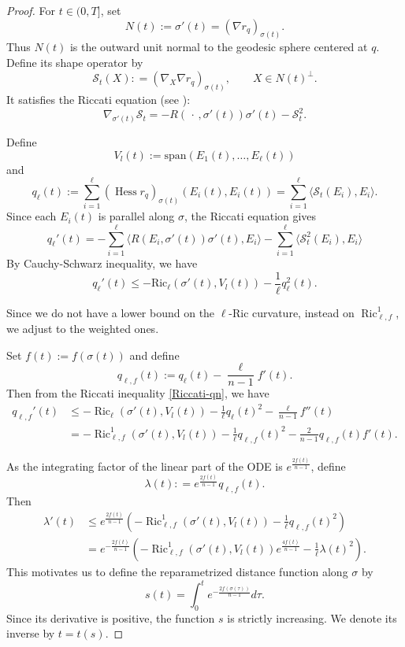 \documentclass[psamsfonts]{amsart}
\theoremstyle{definition}
\theoremstyle{remark}
\DeclareMathOperator{\Ric}{Ric}
\numberwithin{equation}{section}
\begin{document}
    \begin{proof}
        For $t \in (0,T]$, set 
        $$N(t):=\sigma'(t)=(\nabla r_q)_{\sigma(t)}.$$
        Thus $N(t)$ is the outward unit normal to the geodesic sphere centered at $q$.
        Define its shape operator by 
        $$\mathcal{S}_t(X): = (\nabla_X \nabla r_q)_{\sigma (t)}, \qquad X \in N(t)^\perp.$$
        It satisfies the Riccati equation (see \cite[Corollary 3.2.10]{petersen2016riemannian}):
        $$\nabla_{\sigma'(t)} \mathcal{S}_t = - R(\, \cdot \,, \sigma'(t)) \sigma'(t) - \mathcal{S}_t^2.$$
        
        Define
        $$V_l(t) := \mathrm{span}(E_1(t), \ldots, E_\ell(t))$$
        and
        $$q_\ell(t):= \sum_{i=1}^\ell(\operatorname{Hess} r_q)_{\sigma(t)} (E_i(t), E_i(t)) = \sum_{i=1}^\ell \langle \mathcal{S}_t(E_i) , E_i \rangle.$$
        Since each $E_i(t)$ is parallel along $\sigma$, the Riccati equation gives
        $$q_\ell' (t) = - \sum_{i=1}^\ell \langle R(E_i,\sigma'(t))\sigma'(t), E_i\rangle - \sum_{i=1}^\ell \langle \mathcal{S}_t^2(E_i), E_i\rangle$$
        By Cauchy-Schwarz inequality, we have
        \begin{equation}\label{Riccati-qn}
            q_\ell'(t) \leq - \mathrm{Ric}_\ell ({\sigma'(t)}, V_l(t))  - \frac{1}{\ell } q_\ell^2 (t).
        \end{equation}

        Since we do not have a lower bound on the $\ell$-Ric curvature, instead on $\Ric_{\ell,f}^1$, we adjust to the weighted ones. 


Set $f(t) := f(\sigma(t))$
and define
$$
    q_{\ell,f}(t):=q_\ell(t)-\frac{\ell}{n-1}f'(t).
$$
Then from the Riccati inequality \eqref{Riccati-qn}, we have
\begin{align*}
q_{\ell,f}'(t)
&\leq
-\operatorname{Ric}_\ell(\sigma'(t),V_l(t))
-\frac{1}{\ell}q_\ell(t)^2
-\frac{\ell}{n-1}f''(t) \\
&=
-\operatorname{Ric}^{1}_{\ell,f}(\sigma'(t),V_l (t))
-\frac{1}{\ell}q_{\ell,f}(t)^2
-\frac{2}{n-1}q_{\ell,f}(t)f'(t).
\end{align*}

As the integrating factor of the linear part of the ODE is $e^{\frac{2f(t)}{n-1}}$, define
$$
    \lambda(t) : = e^{\frac{2f(t)}{n-1}} q_{\ell,f}(t).
$$
Then 
\begin{align*}
    \lambda'(t)
    &\leq
    e^{\frac{2f(t)}{n-1}}
    \left(
    -\operatorname{Ric}^{1}_{\ell,f}(\sigma'(t),V_l (t))
    -\frac{1}{\ell}q_{\ell,f}(t)^2
    \right)\\
    &  = e^{-\frac{2f(t)}{n-1}} \left(
    -\operatorname{Ric}^{1}_{\ell,f}(\sigma'(t),V_l (t)) e^{\frac{4f(t)}{n-1}}
    -\frac{1}{\ell}\lambda(t)^2
    \right).
\end{align*}
This motivates us to define the reparametrized distance function along $\sigma$ by
\begin{equation}\label{def:s}
    s(t) = \int_0^{t} e^{-\frac{2f(\sigma(\tau))}{n-1}}d \tau.
\end{equation}
Since its derivative is positive, the function $s$ is strictly increasing.
We denote its inverse by $t = t(s)$.


\end{proof}
\end{document}
